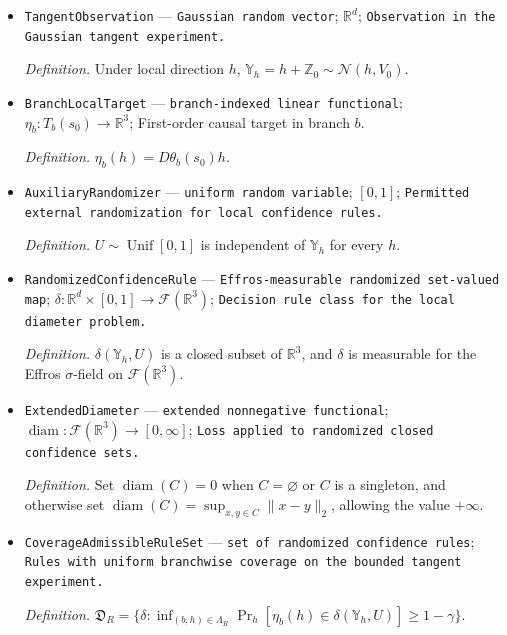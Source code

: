 \documentclass{article}
\begin{document}
\begin{itemize}
  \par\smallskip\noindent\emph{Definition.} \(\Lambda_R=\{(b,h):b\in\mathbb B(s_0),\ h\in T_b(s_0),\ \|h\|_2\le R\}\).
  \item \texttt{TangentObservation} --- \texttt{Gaussian random vector}; \(\mathbb R^d\); \texttt{Observation in the Gaussian tangent experiment.}
  \par\smallskip\noindent\emph{Definition.} Under local direction \(h\), \(\mathbb Y_h=h+\mathbb Z_0\sim\mathcal N(h,V_0)\).
  \item \texttt{BranchLocalTarget} --- \texttt{branch-\allowbreak{}indexed linear functional}; \(\eta_b:T_b(s_0)\to\mathbb R^3\); First-order causal target in branch \(b\).
  \par\smallskip\noindent\emph{Definition.} \(\eta_b(h)=D\theta_b(s_0)h\).
  \item \texttt{AuxiliaryRandomizer} --- \texttt{uniform random variable}; \([0,1]\); \texttt{Permitted external randomization for local confidence rules.}
  \par\smallskip\noindent\emph{Definition.} \(U\sim\operatorname{Unif}[0,1]\) is independent of \(\mathbb Y_h\) for every \(h\).
  \item \texttt{RandomizedConfidenceRule} --- \texttt{Effros-\allowbreak{}measurable randomized set-\allowbreak{}valued map}; \(\delta:\mathbb R^d\times[0,1]\to\mathcal F(\mathbb R^3)\); \texttt{Decision rule class for the local diameter problem.}
  \par\smallskip\noindent\emph{Definition.} \(\delta(\mathbb Y_h,U)\) is a closed subset of \(\mathbb R^3\), and \(\delta\) is measurable for the Effros \(\sigma\)-field on \(\mathcal F(\mathbb R^3)\).
  \item \texttt{ExtendedDiameter} --- \texttt{extended nonnegative functional}; \(\operatorname{diam}:\mathcal F(\mathbb R^3)\to[0,\infty]\); \texttt{Loss applied to randomized closed confidence sets.}
  \par\smallskip\noindent\emph{Definition.} Set \(\operatorname{diam}(C)=0\) when \(C=\varnothing\) or \(C\) is a singleton, and otherwise set \(\operatorname{diam}(C)=\sup_{x,y\in C}\|x-y\|_2\), allowing the value \(+\infty\).
  \item \texttt{CoverageAdmissibleRuleSet} --- \texttt{set of randomized confidence rules}; \texttt{Rules with uniform branchwise coverage on the bounded tangent experiment.}
  \par\smallskip\noindent\emph{Definition.} \(\mathfrak D_R=\{\delta:\inf_{(b,h)\in\Lambda_R}\Pr_h[\eta_b(h)\in\delta(\mathbb Y_h,U)]\ge1-\gamma\}\).

\end{itemize}
\end{document}
